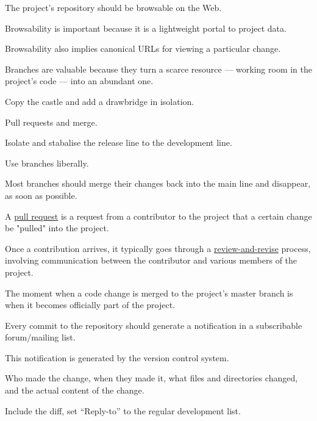 \documentclass[landscape,30pt]{foils}
\begin{document}
The project's repository should be browsable on the Web. 

Browsability is important because it is a lightweight portal to project data.

Browsability also implies canonical URLs for viewing a particular change.


Branches are valuable because they turn a scarce resource — working room in the project's code — into an abundant one. 

Copy the castle and add a drawbridge in isolation.

Pull requests and merge.

Isolate and stabalise the release line to the development line.

Use branches liberally.

Most branches should merge their changes back into the main line and disappear, as soon as possible.


A \underline{pull request} is a request from a contributor to the
project that a certain change be "pulled" into the project.

Once a contribution arrives, it typically goes through a
\underline{review-and-revise} process, involving communication between
the contributor and various members of the project.

The moment when a code change is merged to the project's master branch
is when it becomes officially part of the project.



Every commit to the repository should generate a notification in a subscribable forum/mailing list.

This notification is generated by the version control system.

Who made the change, when they made it, what files and directories changed, and the actual content of the change.

Include the diff, set ``Reply-to'' to the regular development list.

\end{document}
